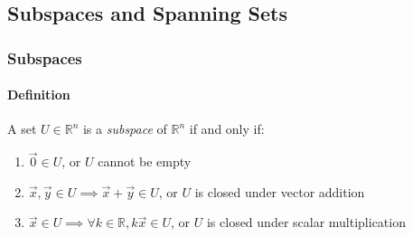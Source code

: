 \subsection{Subspaces and Spanning Sets}
\subsubsection{Subspaces}
\paragraph*{Definition} A set $U \in \mathbb{R}^n$ is a \emph{subspace} of $\mathbb{R}^n$ if and only if:
\begin{enumerate}
    \item $\vec{0} \in U$, or $U$ cannot be empty
    \item $\vec{x}, \vec{y} \in U \implies \vec{x} + \vec{y} \in U$, or $U$ is closed under vector addition
    \item $\vec{x} \in U \implies \forall k \in \mathbb{R}, k\vec{x} \in U$, or $U$ is closed under scalar multiplication
\end{enumerate}

